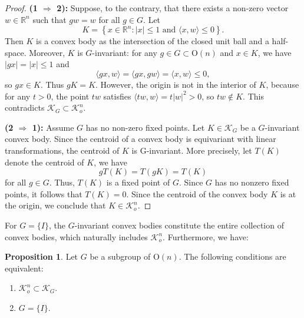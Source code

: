 \documentclass[12pt, reqno]{amsart}
\theoremstyle{definition}
\newtheorem{proposition}[theorem]{Proposition}
\theoremstyle{remark}
\numberwithin{equation}{section}
\newcommand{\On}{\mathrm{O}(n)}
\newcommand{\KG}{\mathcal{K}_{G}}
\begin{document}
		\begin{proof}
		\noindent\textbf{(1 $\Rightarrow$ 2):} 
		Suppose, to the contrary, that there exists a non-zero vector $w \in \mathbb{R}^n $ 
		such that $g w = w$ for all $g \in G$. Let 
		\[
		K = \left\{ x \in \mathbb{R}^n : |x| \leq 1 \text{ and } \langle x, w \rangle \leq 0 \right\}.
		\]
		Then $K$ is a convex body as the intersection of the closed unit ball and a half-space. 
		Moreover, $K$ is $G$-invariant: for any $g \in G\subset \On$ and $x \in K$, we have $|gx| =|x| \leq 1$ and
		\[
		\langle gx, w \rangle = \langle gx, gw \rangle = \langle x, w \rangle \leq 0,
		\]
	so $gx\in K$. Thus $gK = K$. However, the origin is not in the interior of $K$, 
		because for any $t > 0$, the point $t w$ satisfies $\langle t w, w \rangle = t |w|^{2} > 0$, so $t w \notin K$. 
		This contradicts $\KG \subset \mathcal{K}^{n}_{o}$.
		
	\noindent\textbf{(2 $\Rightarrow$ 1):}  
		Assume $G$ has no non-zero fixed points. Let $K \in \mathcal{K}_{G}$ be a $G$-invariant convex body. 
		Since the centroid of a convex body is equivariant with linear transformations, the centroid of $K$ is G-invariant. More precisely, let $T(K)$ denote the centroid of $K$, we have
		$$gT(K)=T(gK)=T(K)$$
		for all $g\in G$. Thus, 
		$T(K)$ is a fixed point of $G$. Since $G$ has no nonzero fixed points, it follows that $T(K) = 0$. Since the centroid of the convex body $K$ is at the origin, we conclude that $K \in \mathcal{K}_o^n$.
	\end{proof}
	
	
	For $G = \{I\}$, the $G$-invariant convex bodies constitute the entire collection of convex bodies, which naturally includes $\mathcal{K}_o^n$. Furthermore, we have:
	
	
		\begin{proposition} \label{int2}
		Let \(G\) be a  subgroup of \(\On\). The following conditions are equivalent:
		\begin{enumerate}
			\item $\mathcal{K}^{n}_{o} \subset \KG$.
			\item $G=\{I\}$.
		\end{enumerate}
	\end{proposition}
	
\end{document}
